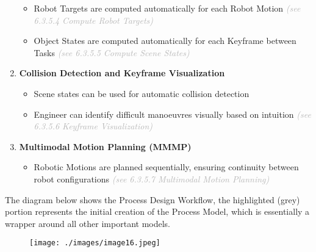 \begin{enumerate}
\begin{itemize}
	\item Robot Targets are computed automatically for each Robot Motion \textit{\textcolor[HTML]{B7B7B7}{(see 6.3.5.4 Compute Robot Targets)}}

	\item Object States are computed automatically for each Keyframe between Tasks \textit{\textcolor[HTML]{B7B7B7}{(see 6.3.5.5 Compute Scene States)}}

\end{itemize}
	\item \textbf{Collision Detection and Keyframe Visualization}

\begin{itemize}
	\item Scene states can be used for automatic collision detection

	\item Engineer can identify difficult manoeuvres visually based on intuition \textit{\textcolor[HTML]{B7B7B7}{(see 6.3.5.6 Keyframe Visualization)}}

\end{itemize}

    \item \textbf{Multimodal Motion Planning (MMMP)}

\begin{itemize}
	\item Robotic Motions are planned sequentially, ensuring continuity between robot configurations \textit{\textcolor[HTML]{B7B7B7}{(see 6.3.5.7 Multimodal Motion Planning)}}

\end{itemize}
\end{enumerate}

The diagram below shows the Process Design Workflow, the highlighted (grey) portion represents the initial creation of the Process Model, which is essentially a wrapper around all other important models. 

\begin{figure}[H]
\texttt{[image: ./images/image16.jpeg]}
\end{figure}


